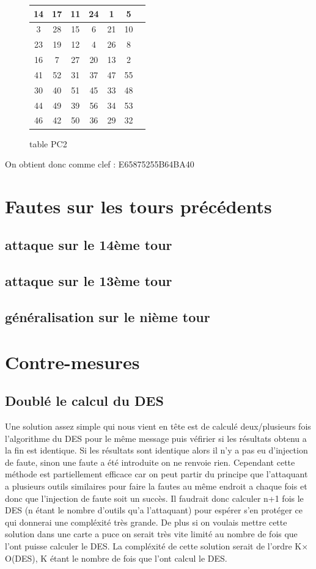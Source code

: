 \documentclass[a4paper]{report}
\begin{document}
			\begin{figure}[h]
			\begin{tabular}{|c|c|c|c|c|c|c|}
			\hline
			14 & 17 & 11 & 24 & 1 & 5 \\ \hline
			3 & 28 & 15 & 6 & 21 & 10 \\ \hline
			23 & 19 & 12 & 4 & 26 & 8 \\ \hline
			16 & 7 & 27 & 20 & 13 & 2 \\ \hline
			\hline
			 41 & 52 & 31 & 37 & 47 & 55 \\ \hline
			 30 & 40 & 51 & 45 & 33 & 48 \\ \hline
			 44 & 49 & 39 & 56 & 34 & 53 \\ \hline
			 46 & 42 & 50 & 36 & 29 & 32 \\ \hline
			\end{tabular}
			\caption{table PC2}
			\end{figure}
			
			On obtient donc comme clef : E65875255B64BA40
		
		\chapter{Fautes sur les tours précédents}
			\section{attaque sur le 14ème tour}
			\section{attaque sur le 13ème tour}
			\section{généralisation sur le nième tour}
		
		\chapter{Contre-mesures}
			\section{Doublé le calcul du DES}
				Une solution assez simple qui nous vient en tête est de calculé deux/plusieurs fois l'algorithme du DES pour le même message puis véfirier si les résultats obtenu a la fin est
				identique.
				Si les résultats sont identique alors il n'y a pas eu d'injection de faute, sinon une faute a été introduite on ne renvoie rien.
				Cependant cette méthode est partiellement efficace car on peut partir du principe que l'attaquant a plusieurs outils similaires pour faire la fautes au même endroit a chaque fois et 
				donc que l'injection de faute soit un succès. 
				Il faudrait donc calculer n+1 fois le DES (n étant le nombre d'outils qu'a l'attaquant) pour espérer s'en protéger ce qui donnerai une compléxité très grande. 
				De plus si on voulais mettre cette solution dans une carte a puce on serait très vite limité au nombre de fois que l'ont puisse calculer le DES.
				La compléxité de cette solution serait de l'ordre K$\times$O(DES), K étant le nombre de fois que l'ont calcul le DES.
			
\end{document}

